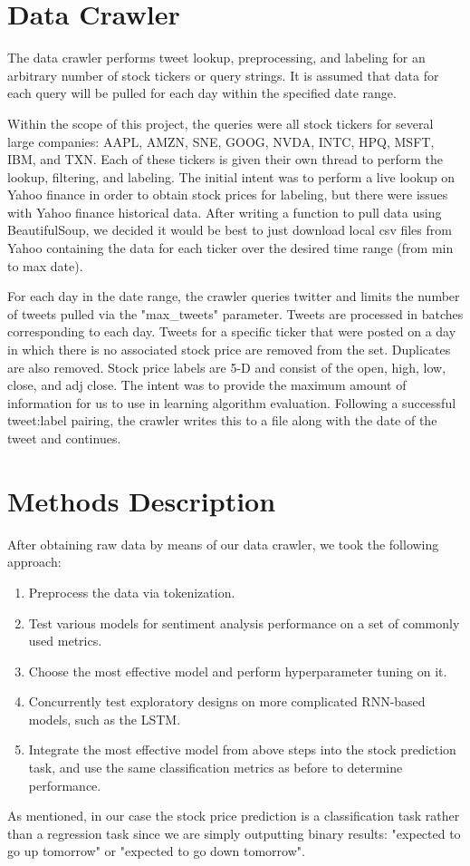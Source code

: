 \documentclass{sig-alternate-05-2015}
\begin{document}
	\section{Data Crawler}
	The data crawler performs tweet lookup, preprocessing, and labeling for an arbitrary number of stock tickers or query strings. It is assumed that data for each query will be pulled for each day within the specified date range. 
	\par
	Within the scope of this project, the queries were all stock tickers for several large companies: AAPL, AMZN, SNE, GOOG, NVDA, INTC, HPQ, MSFT, IBM, and TXN. Each of these tickers is given their own thread to perform the lookup, filtering, and labeling. The initial intent was to perform a live lookup on Yahoo finance in order to obtain stock prices for labeling, but there were issues with Yahoo finance historical data. After writing a function to pull data using BeautifulSoup, we decided it would be best to just download local csv files from Yahoo containing the data for each ticker over the desired time range (from min to max date). 
	\par 
	For each day in the date range, the crawler queries twitter and limits the number of tweets pulled via the "max\_tweets" parameter.  Tweets are processed in batches corresponding to each day. Tweets for a specific ticker that were posted on a day in which there is no associated stock price are removed from the set. Duplicates are also removed. Stock price labels are 5-D and consist of the open, high, low, close, and adj close. The intent was to provide the maximum amount of information for us to use in learning algorithm evaluation. Following a successful tweet:label pairing, the crawler writes this to a file along with the date of the tweet and continues.
	\section{Methods Description}
	After obtaining raw data by means of our data crawler, we took the following approach:
	\begin{enumerate}
		\item Preprocess the data via tokenization.
		\item Test various models for sentiment analysis performance on a set of commonly used metrics.
		\item Choose the most effective model and perform hyperparameter tuning on it.
		\item Concurrently test exploratory designs on more complicated RNN-based models, such as the LSTM.
		\item Integrate the most effective model from above steps into the stock prediction task, and use the same classification metrics as before to determine performance.
	\end{enumerate}
	As mentioned, in our case the stock price prediction is a classification task rather than a regression task since we are simply outputting binary results: "expected to go up tomorrow" or "expected to go down tomorrow".
\end{document}
